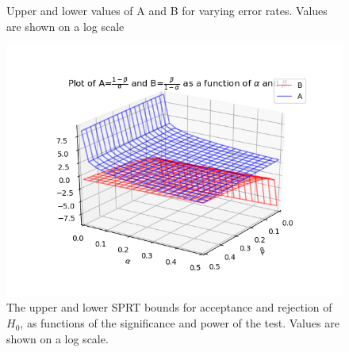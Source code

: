 \begin{figure}%
    \centering
    \qquad
    \caption{Upper and lower values of A and B for varying error rates. Values are shown on a log scale}%
    \label{fig:VaryingSPRTParametersProjected1}%
\end{figure}


\begin{figure}
    \centering
    \includegraphics[width = 0.75\linewidth]{Chapters/MultiAgentTargetDetection/Figs/SearchTermination/AandBAsFunctionOfAlphaAndBetaLogTransform.png}
    \caption{The upper and lower SPRT bounds for acceptance and rejection of $H_0$, as functions of the significance and power of the test. Values are shown on a log scale.}
    \label{fig:SPRTCutoffFunctionOfAlphaAndBeta}
\end{figure}


